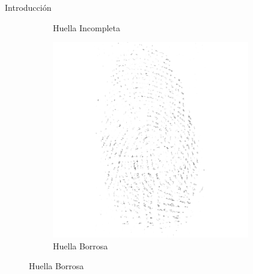 \documentclass[12pt,aspectratio=169]{beamer}
\begin{document}
\begin{frame}{Introducción}
\begin{figure}
\begin{subfigure}{0.23\textwidth}
            \caption{Huella Incompleta}
        \end{subfigure}
        \begin{subfigure}{0.23\textwidth}
            \centering
            \includegraphics[scale=0.3]{figs/deteriorada_0.png}
            \caption{Huella Borrosa}
        \end{subfigure}
    \end{figure}

\end{frame}
\end{document}
